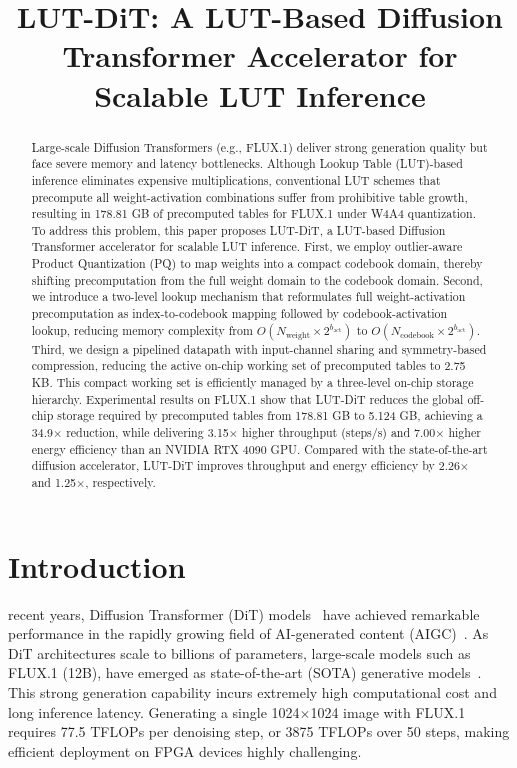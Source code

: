 
\title{LUT-DiT: A LUT-Based Diffusion Transformer Accelerator for Scalable LUT Inference}

\begin{abstract}
Large-scale Diffusion Transformers (e.g., FLUX.1) deliver strong generation quality but face severe memory and latency bottlenecks. Although Lookup Table (LUT)-based inference eliminates expensive multiplications, conventional LUT schemes that precompute all weight-activation combinations suffer from prohibitive table growth, resulting in 178.81 GB of precomputed tables for FLUX.1 under W4A4 quantization. To address this problem, this paper proposes LUT-DiT, a LUT-based Diffusion Transformer accelerator for scalable LUT inference. First, we employ outlier-aware Product Quantization (PQ) to map weights into a compact codebook domain, thereby shifting precomputation from the full weight domain to the codebook domain. Second, we introduce a two-level lookup mechanism that reformulates full weight-activation precomputation as index-to-codebook mapping followed by codebook-activation lookup, reducing memory complexity from $O(N_{\text{weight}} \times 2^{b_{\text{act}}})$ to $O(N_{\text{codebook}} \times 2^{b_{\text{act}}})$. Third, we design a pipelined datapath with input-channel sharing and symmetry-based compression, reducing the active on-chip working set of precomputed tables to 2.75 KB. This compact working set is efficiently managed by a three-level on-chip storage hierarchy. Experimental results on FLUX.1 show that LUT-DiT reduces the global off-chip storage required by precomputed tables from 178.81 GB to 5.124 GB, achieving a 34.9$\times$ reduction, while delivering 3.15$\times$ higher throughput (steps/s) and 7.00$\times$ higher energy efficiency than an NVIDIA RTX 4090 GPU. Compared with the state-of-the-art diffusion accelerator, LUT-DiT improves throughput and energy efficiency by 2.26$\times$ and 1.25$\times$, respectively.
\end{abstract}

\section{Introduction}
\label{sec:intro}
 recent years, Diffusion Transformer (DiT) models~\cite{dit} have achieved remarkable performance in the rapidly growing field of AI-generated content (AIGC)~\cite{ddpm,ldm,repaint}. As DiT architectures scale to billions of parameters, large-scale models such as FLUX.1 (12B), have emerged as state-of-the-art (SOTA) generative models~\cite{flux}. This strong generation capability incurs extremely high computational cost and long inference latency. Generating a single 1024$\times$1024 image with FLUX.1 requires 77.5 TFLOPs per denoising step, or 3875 TFLOPs over 50 steps, making efficient deployment on FPGA devices highly challenging.

